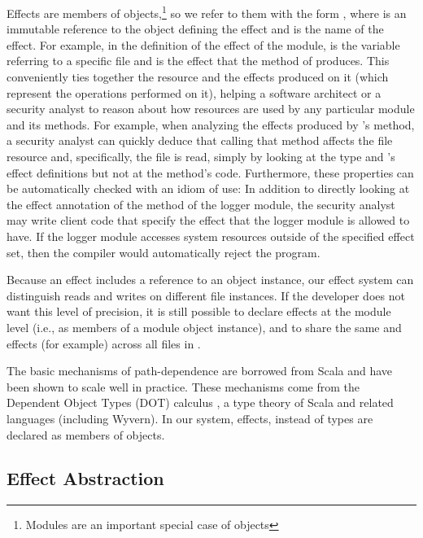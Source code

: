 Effects are members of objects,\footnote{Modules are an important special case of objects} so we refer to them with the form , where  is an immutable reference to the object defining the effect and  is the name of the effect. For example, in the definition of the  effect of the  module,  is the variable referring to a specific file and  is the effect that the  method of  produces. This conveniently ties together the resource and the effects produced on it (which represent the operations performed on it), helping a software architect or a security analyst to reason about how resources are used by any particular module and its methods. For example, when analyzing the effects produced by 's  method, a security analyst can quickly deduce that calling that method affects the file resource and, specifically, the file is read, simply by looking at the  type and 's effect definitions but not at the method's code. Furthermore, these properties can be automatically checked with an idiom of use: In addition to directly looking at the effect annotation of the method of the logger module, the security analyst may write client code that specify the effect that the logger module is allowed to have. If the logger module accesses system resources outside of the specified effect set, then the compiler would automatically reject the program.

Because an effect includes a reference to an object instance, our effect system can distinguish reads and writes on different file instances. If the developer does not want this level of precision, it is still possible to declare effects at the module level (i.e., as members of a  module object instance), and to share the same  and  effects (for example) across all files in .

The basic mechanisms of path-dependence are borrowed from Scala and have been shown to scale well in practice. These mechanisms come from the Dependent Object Types (DOT) calculus \cite{amin14}, a type theory of Scala and related languages (including Wyvern). In our system, effects, instead of types are declared as members of objects.

\subsection{Effect Abstraction}
\label{sec:effect-abstraction}

